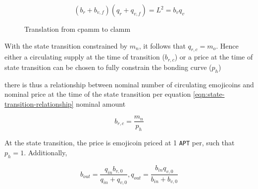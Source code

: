 \documentclass[table, twocolumn]{article}
\begin{document}
\begin{equation} \label{eqn:clamm-curve-translation}
  (b_r + b_{v, f})(q_r + q_{v, f}) = L^2 = b_v q_v
\end{equation}

\begin{figure}[!htb]
  \centering
  
  \caption{Translation from \gls{cpamm} to \gls{clamm}}
  \label{fig:clamm-curve-translation}
\end{figure}

With the state transition constrained by $m_n$, it follows that $q_{r, c} = m_o$. Hence
either a circulating supply at the time of transition ($b_{r, c}$) or a price at the
time of state transition can be chosen to fully constrain the bonding curve ($p_h$)

there is thus a relationship between
nominal number of circulating emojicoins and nominal price at the time of the state
transition per equation \ref{eqn:state-transition-relationship}
nominal amount

\begin{equation} \label{eqn:state-transition-relationship}
  b_{r, c} = \frac{m_n}{p_h}
\end{equation}


At the state transition, the price is emojicoin priced at 1 \texttt{APT} per, such that
$p_h = 1$. Additionally,

\begin{equation} \label{eqn:b-q-out-clamm-simple}
  b_{out} = \frac{q_{in} b_{v, 0}}{q_{in} + q_{v, 0}},
  q_{out} = \frac{b_{in} q_{v, 0}}{b_{in} + b_{v, 0}}
\end{equation}
\end{document}
